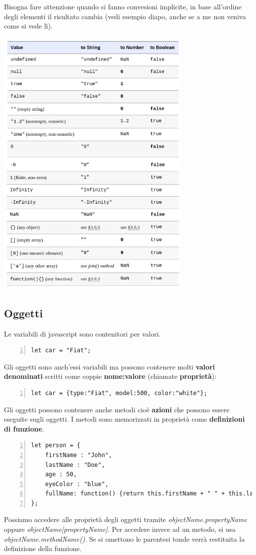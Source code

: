 Bisogna fare attenzione quando si fanno convesioni implicite, in base all'ordine degli elementi il risultato cambia (vedi esempio diapo, anche se a me non veniva come si vede lì).

\begin{center}
    \includegraphics[scale=0.4]{Images/TecnologieWeb/8/ConversioneTipi.jpg}
\end{center}

\subsection{Oggetti}
Le variabili di javascript sono contenitori per valori.
\begin{Verbatim}[numbers = left, frame=single]
let car = "Fiat";
\end{Verbatim}
Gli oggetti sono anch'essi variabili ma possono contenere molti \textbf{valori denominati} scritti come coppie \textbf{nome:valore} (chiamate \textbf{proprietà}):
    \begin{Verbatim}[numbers = left, frame=single]
let car = {type:"Fiat", model:500, color:"white"};
\end{Verbatim}
Gli oggetti possono contenere anche metodi cioè \textbf{azioni} che possono essere eseguite sugli oggetti. I metodi sono memorizzati in proprietà come \textbf{definizioni di funzione}.
    \begin{Verbatim}[numbers = left, frame=single]
let person = {
    firstName : "John",
    lastName : "Doe",
    age : 50,
    eyeColor : "blue",
    fullName: function() {return this.firstName + " " + this.lastName;}
};
\end{Verbatim}
Possiamo accedere alle proprietà degli oggetti tramite \emph{objectName.propertyName} oppure \emph{objectName[propertyName]}.
Per accedere invece ad un metodo, si usa \emph{objectName.methodName()}. Se si omettono le parentesi tonde verrà restituita la definizione della funzione. \\

